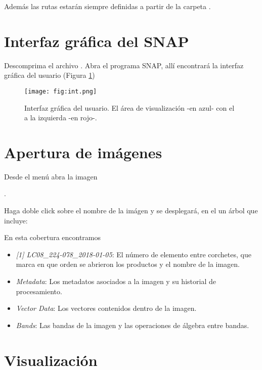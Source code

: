 Además las rutas estarán siempre definidas a partir de la carpeta .

\section{Interfaz gráfica del SNAP}

Descomprima el archivo . Abra el programa SNAP, allí encontrará la interfaz gráfica del usuario (Figura \ref{fig:int})

\begin{figure}[h!]
    \centering
    \texttt{[image: fig:int.png]}
    \caption{Interfaz gráfica del usuario. El área de visualización -en azul- con el  a la izquierda -en rojo-.}
    \label{fig:int}
\end{figure}

\section{Apertura de imágenes}

Desde el menú  abra la imagen
\begin{center} .
\end{center}
Haga doble click sobre el nombre de la imágen y se desplegará, en el  un árbol que incluye:
\\

En esta cobertura encontramos

\begin{itemize}
    \item \emph{[1] LC08\_224-078\_2018-01-05}: El número de elemento entre corchetes, que marca en que orden se abrieron los productos y el nombre de la imagen.
    \item \emph{Metadata}: Los metadatos asociados a la imagen y su historial de procesamiento.
    \item \emph{Vector Data}: Los vectores contenidos dentro de la imagen.
    \item \emph{Bands}: Las bandas de la imagen y las operaciones de álgebra entre bandas.
\end{itemize}

\section{Visualización}

